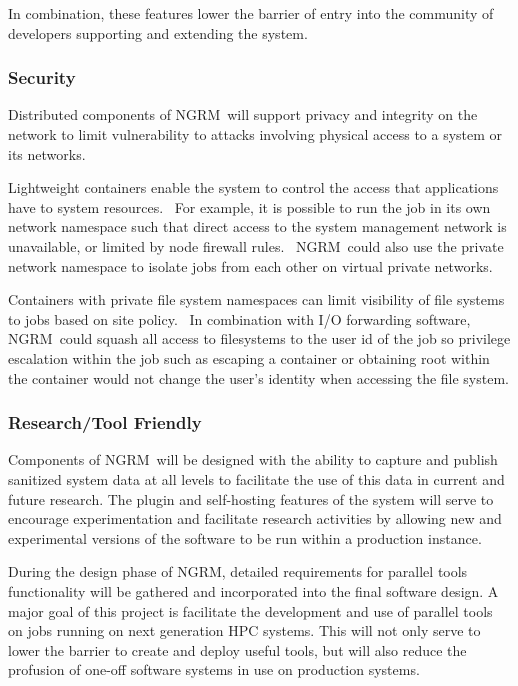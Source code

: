 \documentclass{article}
\newcommand{\ngrm}{NGRM}
\begin{document}
In combination, these features lower the barrier of entry into the
community of developers supporting and extending the system.

\subsubsection{Security}

Distributed components of \ngrm\ will support privacy and integrity on
the network to limit vulnerability to attacks involving physical access
to a system or its networks.

Lightweight containers enable the system to control the access that
applications have to system resources.  For example, it is possible to
run the job in its own network namespace such that direct access to the
system management network is unavailable, or limited by node firewall
rules.  \ngrm\ could also use the private network namespace to isolate
jobs from each other on virtual private networks.

Containers with private file system namespaces can limit visibility of
file systems to jobs based on site policy.  In combination with I/O
forwarding software, \ngrm\ could squash all access to filesystems to
the user id of the job so privilege escalation within the job such as
escaping a container or obtaining root within the container would not
change the user’s identity when accessing the file system.

\subsubsection{Research/Tool Friendly}

Components of \ngrm\ will be designed with the ability to capture and
publish sanitized system data at all levels to facilitate the use of
this data in current and future research.  The plugin and self-hosting
features of the system will serve to encourage experimentation and
facilitate research activities by allowing new and experimental
versions of the software to be run within a production instance.

During the design phase of \ngrm , detailed requirements for parallel
tools functionality will be gathered and incorporated into the final
software design. A major goal of this project is facilitate the
development and use of parallel tools on jobs running on next
generation HPC systems. This will not only serve to lower the
barrier to create and deploy useful tools, but will also reduce the
profusion of one-off software systems in use on production systems.
\end{document}
